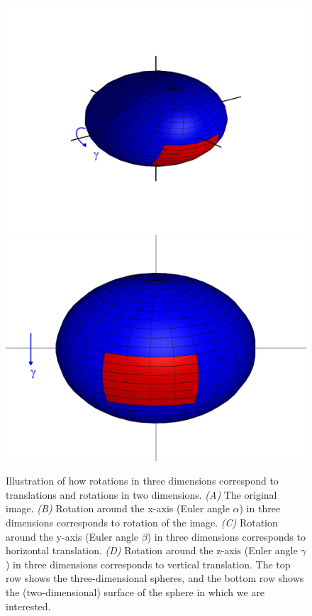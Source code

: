 \documentclass[12pt]{article}
\begin{document}
\begin{figure}[H]
\begin{minipage}{0.2\textwidth}
\end{minipage}
\begin{minipage}{0.2\textwidth} 
\centering
\includegraphics[width=\textwidth]{sphere_4}\\
\includegraphics[width=\textwidth]{sphere2_4}\\
\end{minipage}
\caption{Illustration of how rotations in three dimensions correspond to translations and rotations in two dimensions. {\it (A)} The original image. {\it (B)} Rotation around the x-axis (Euler angle $\alpha$) in three dimensions corresponds to rotation of the image. {\it (C)} Rotation around the y-axis (Euler angle $\beta$) in three dimensions corresponds to horizontal translation. {\it (D)} Rotation around the z-axis (Euler angle $\gamma$) in three dimensions corresponds to vertical translation. The top row shows the three-dimensional spheres, and the bottom row shows the (two-dimensional) surface of the sphere in which we are interested.}
\label{fig:SO3_picture}
\end{figure}
\end{document}
